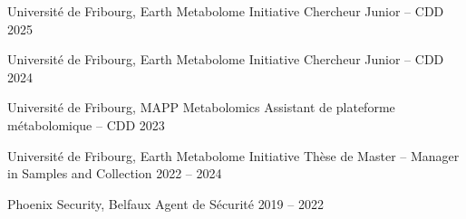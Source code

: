 

\begin{cventries}


\cventrynoloc
  {Université de Fribourg, Earth Metabolome Initiative} %
  {Chercheur Junior – CDD} %
  {2025} %
  {}

\cventrynoloc
  {Université de Fribourg, Earth Metabolome Initiative} %
  {Chercheur Junior – CDD} %
  {2024} %
  {}

\cventrynoloc
  {Université de Fribourg, MAPP Metabolomics} %
  {Assistant de plateforme métabolomique – CDD} %
  {2023} %
  {}

\cventrynoloc
  {Université de Fribourg, Earth Metabolome Initiative} %
  {Thèse de Master – Manager in Samples and Collection} %
  {2022 -- 2024} %
  {}

\cventrynoloc
  {Phoenix Security, Belfaux} %
  {Agent de Sécurité} %
  {2019 -- 2022} %
  {}

\end{cventries}
